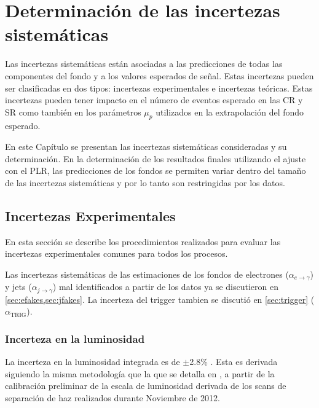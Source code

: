 \section{Determinación de las incertezas sistemáticas}
\label{cap:sistematicos}

Las incertezas sistemáticas están asociadas a las predicciones de todas las
componentes del fondo y a los valores esperados de señal. Estas incertezas
pueden ser clasificadas en dos tipos: incertezas experimentales e incertezas
teóricas. Estas incertezas pueden tener impacto en el número de eventos esperado
en las CR y SR como también en los parámetros $\mu_p$ utilizados en la
extrapolación del fondo esperado.

En este Capítulo se presentan las incertezas sistemáticas consideradas y su
determinación. En la determinación de los resultados finales utilizando el
ajuste con el PLR, las predicciones de los fondos se permiten variar dentro del
tamaño de las incertezas sistemáticas y por lo tanto son restringidas por los
datos.



\subsection{Incertezas Experimentales}\label{sec:expsyst}

En esta sección se describe los procedimientos realizados para evaluar
las incertezas experimentales comunes para todos los procesos.

Las incertezas sistemáticas de las estimaciones de los fondos de electrones
($\alpha_{e\to\gamma}$) y jets ($\alpha_{j\to\gamma}$) mal identificados a partir
de los datos ya se discutieron en \cref{sec:efakes,sec:jfakes}. La incerteza del
trigger tambien se discutió en \cref{sec:trigger} ($\alpha_\text{TRIG}$).

\subsubsection{Incerteza en la luminosidad}

La incerteza en la luminosidad integrada es de $\pm$2.8\% \cite{lumi2012}.
Esta es derivada siguiendo la misma metodología que la que se detalla en \cite{lumi2011},
a partir de la calibración preliminar  de la escala de luminosidad derivada
de los scans de separación de haz realizados durante Noviembre de 2012.



